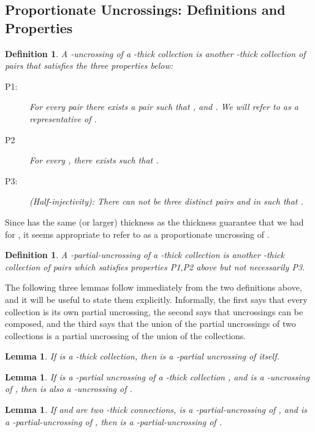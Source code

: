 \documentclass[11pt]{article}
\newtheorem{lemma}[theorem]{Lemma}
\newtheorem{definition}[theorem]{Definition}
\begin{document}
\subsection{Proportionate Uncrossings: Definitions and Properties}
\label{sec:define-proportionate}
\begin{definition}
\label{define:uncross}
A -uncrossing of a -thick collection  is another
-thick collection of pairs  that satisfies the three
properties below:
\begin{description}
\item[P1:] For every pair  there exists a pair  such that , and . We will refer to  as a representative of .
\item[P2] For every , there exists  such
    that .
  \item[P3:] {\em (Half-injectivity):} There can not be three distinct pairs
     and  in  such that .
\end{description}
\end{definition}

Since  has the same (or larger) thickness as the thickness guarantee
that we had for , it seems appropriate to refer to  as a
proportionate uncrossing of .

\begin{definition}
  \label{define:partial}
  A -partial-uncrossing of a -thick collection  is
  another -thick collection of pairs  which satisfies
  properties P1,P2 above but not necessarily P3.
\end{definition}
The following three lemmas follow immediately from the two definitions above,
and it will be useful to state them explicitly. Informally, the first says
that every collection is its own partial uncrossing, the second says that
uncrossings can be composed, and the third says that the union of the partial
uncrossings of two collections is a partial uncrossing of the union of the
collections.
\begin{lemma}
  \label{lem:self-uncross}
  If  is a -thick collection, then  is a
  -partial uncrossing of itself.
\end{lemma}
\begin{lemma}
\label{lem:compose}
If  is a -partial uncrossing of a -thick collection
, and  is a -uncrossing of , then
 is also a -uncrossing of .
\end{lemma}
\begin{lemma}
  \label{lem:union}
  If  and  are two -thick connections, 
  is a -partial-uncrossing of , and  is a
  -partial-uncrossing of , then 
  is a -partial-uncrossing of .
\end{lemma}
\end{document}
